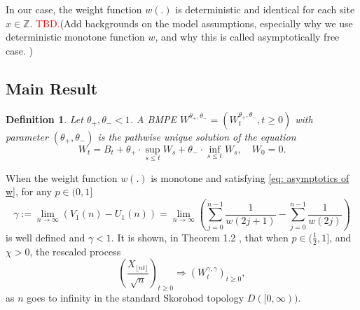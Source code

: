 \documentclass[twoside,12pt,a4paper]{article}
\newtheorem{definition}{Definition}[section]
\numberwithin{equation}{section}
\newcommand\TBD{\textcolor{red}{TBD.}}
\begin{document}
In our case, the weight function $w(.)$ is deterministic and identical for each site $x\in \mathbb{Z}$. \TBD (Add backgrounds on the model assumptions, especially why we use deterministic monotone function $w$, and why this is called asymptotically free case. )

\subsection{Main Result}
\begin{definition}
	Let $\theta_+, \theta_- <1$. A BMPE $W^{\theta_+, \theta_-} = \left(W^{\theta_+, \theta_-}_t, t\geq 0\right)$ with parameter  $(\theta_+, \theta_-)$ is the pathwise unique solution of the equation
	$$
	W_t = B_t + \theta_+ \cdot \sup_{s\leq t} W_s  + \theta_- \cdot \inf_{s\leq t} W_s,   \quad W_0 = 0.
	$$
\end{definition}
When the weight function $w(.)$ is monotone and satisfying \eqref{eq: asymptotics of w}, for any $p\in (0,1]$
\begin{equation}\label{eq: gamma}
	\gamma:= \lim_{n\to \infty}\left( V_1(n) - U_1(n) \right) =\lim_{n\to \infty} \left( \sum_{j=0}^{n-1} \frac{1}{ w(2j+1)}-  \sum_{j=0}^{n-1}  \frac{1}{w(2j)} \right) 
\end{equation}
is well defined and $\gamma<1$. It is shown, in Theorem 1.2 \cite{KMP22}, that when $p\in (\frac{1}{2},1]$, and $\mathcal{\chi} >0 $, the rescaled process
$$
 \left(  \frac{X_{\lfloor nt \rfloor }}{\sqrt{n}}  \right)_{t\geq 0} \Longrightarrow \left( W^{\gamma,\gamma}_{t}\right)_{t\geq 0},
$$ as $n$ goes to infinity in the standard Skorohod topology $D([0,\infty) ).$
\end{document}
